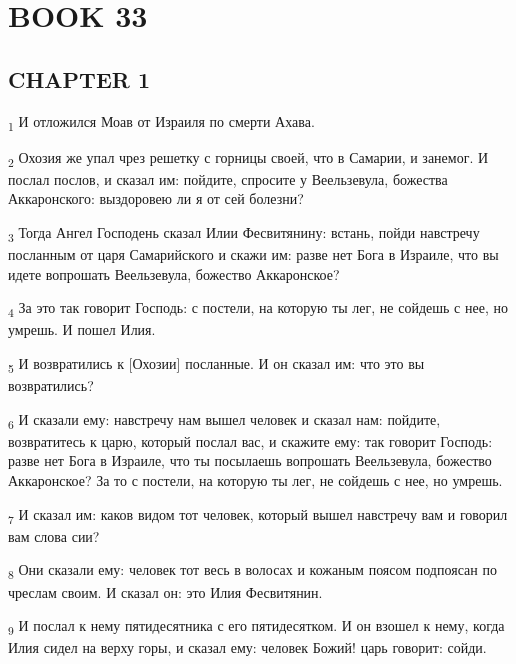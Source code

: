 \section{BOOK 33}
\subsection{CHAPTER 1}
\begin{tcolorbox}
\textsubscript{1} И отложился Моав от Израиля по смерти Ахава.
\end{tcolorbox}
\begin{tcolorbox}
\textsubscript{2} Охозия же упал чрез решетку с горницы своей, что в Самарии, и занемог. И послал послов, и сказал им: пойдите, спросите у Веельзевула, божества Аккаронского: выздоровею ли я от сей болезни?
\end{tcolorbox}
\begin{tcolorbox}
\textsubscript{3} Тогда Ангел Господень сказал Илии Фесвитянину: встань, пойди навстречу посланным от царя Самарийского и скажи им: разве нет Бога в Израиле, что вы идете вопрошать Веельзевула, божество Аккаронское?
\end{tcolorbox}
\begin{tcolorbox}
\textsubscript{4} За это так говорит Господь: с постели, на которую ты лег, не сойдешь с нее, но умрешь. И пошел Илия.
\end{tcolorbox}
\begin{tcolorbox}
\textsubscript{5} И возвратились к [Охозии] посланные. И он сказал им: что это вы возвратились?
\end{tcolorbox}
\begin{tcolorbox}
\textsubscript{6} И сказали ему: навстречу нам вышел человек и сказал нам: пойдите, возвратитесь к царю, который послал вас, и скажите ему: так говорит Господь: разве нет Бога в Израиле, что ты посылаешь вопрошать Веельзевула, божество Аккаронское? За то с постели, на которую ты лег, не сойдешь с нее, но умрешь.
\end{tcolorbox}
\begin{tcolorbox}
\textsubscript{7} И сказал им: каков видом тот человек, который вышел навстречу вам и говорил вам слова сии?
\end{tcolorbox}
\begin{tcolorbox}
\textsubscript{8} Они сказали ему: человек тот весь в волосах и кожаным поясом подпоясан по чреслам своим. И сказал он: это Илия Фесвитянин.
\end{tcolorbox}
\begin{tcolorbox}
\textsubscript{9} И послал к нему пятидесятника с его пятидесятком. И он взошел к нему, когда Илия сидел на верху горы, и сказал ему: человек Божий! царь говорит: сойди.
\end{tcolorbox}
